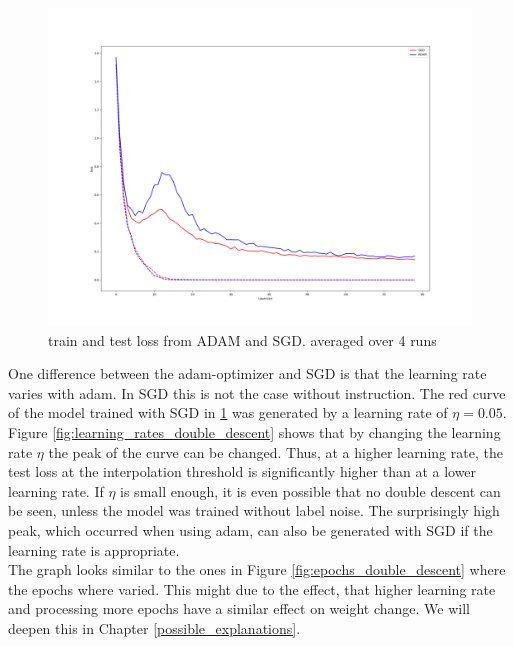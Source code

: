 \begin{figure}[!htp]
\centering
\includegraphics[width= 1\linewidth]{Abschlussarbeit_2021/LaTeX/images/ADAM_vs_SGD.png}
\caption{train and test loss from ADAM and SGD. averaged over 4 runs}
\label{fig:double_descent_on_optimizers}
\end{figure}

One difference between the adam-optimizer and SGD is that the learning rate varies with adam. In SGD this is not the case without instruction. The red curve of the model trained with SGD in \ref{fig:double_descent_on_optimizers} was generated by a learning rate of $\eta = 0.05$. Figure \ref{fig:learning_rates_double_descent} shows that by changing the learning rate $\eta$ the peak of the curve can be changed. Thus, at a higher learning rate, the test loss at the interpolation threshold is significantly higher than at a lower learning rate. If $\eta$ is small enough, it is even possible that no double descent can be seen, unless the model was trained without label noise. The surprisingly high peak, which occurred when using adam, can also be generated with SGD if the learning rate is appropriate. \\
The graph looks similar to the ones in Figure \ref{fig:epochs_double_descent} where the epochs where varied. This might due to the effect, that higher learning rate and processing more epochs have a similar effect on weight change. We will deepen this in Chapter \ref{possible_explanations}. 

